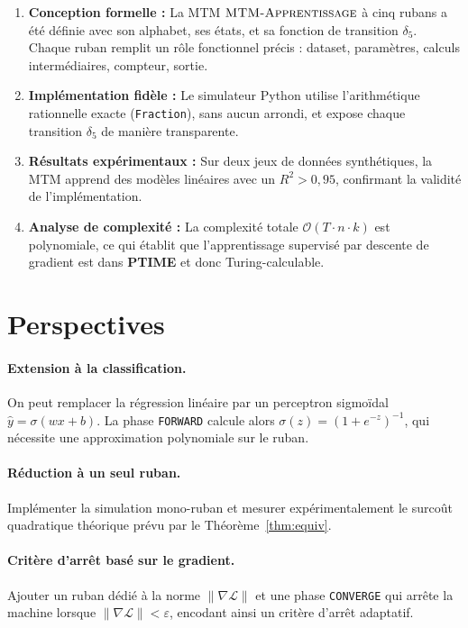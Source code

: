 \documentclass[12pt, a4paper, oneside]{report}
\newcommand{\mtmlong}{\textsc{MTM-Apprentissage}}
\newcommand{\state}[1]{\texttt{#1}}
\begin{document}
\begin{enumerate}[leftmargin=*, label=\textbf{C\arabic*.}]
  \item \textbf{Conception formelle :} La MTM $\mtmlong$ à cinq rubans a été définie avec son alphabet, ses états, et sa fonction de transition $\delta_5$. Chaque ruban remplit un rôle fonctionnel précis : dataset, paramètres, calculs intermédiaires, compteur, sortie.

  \item \textbf{Implémentation fidèle :} Le simulateur Python utilise l'arithmétique rationnelle exacte (\texttt{Fraction}), sans aucun arrondi, et expose chaque transition $\delta_5$ de manière transparente.

  \item \textbf{Résultats expérimentaux :} Sur deux jeux de données synthétiques, la MTM apprend des modèles linéaires avec un $R^2 > 0{,}95$, confirmant la validité de l'implémentation.

  \item \textbf{Analyse de complexité :} La complexité totale $\mathcal{O}(T \cdot n \cdot k)$ est polynomiale, ce qui établit que l'apprentissage supervisé par descente de gradient est dans \textbf{PTIME} et donc Turing-calculable.
\end{enumerate}

\section{Perspectives}

\paragraph{Extension à la classification.} On peut remplacer la régression linéaire par un perceptron sigmoïdal $\hat{y} = \sigma(wx+b)$. La phase \state{FORWARD} calcule alors $\sigma(z) = (1 + e^{-z})^{-1}$, qui nécessite une approximation polynomiale sur le ruban.

\paragraph{Réduction à un seul ruban.} Implémenter la simulation mono-ruban et mesurer expérimentalement le surcoût quadratique théorique prévu par le Théorème~\ref{thm:equiv}.

\paragraph{Critère d'arrêt basé sur le gradient.} Ajouter un ruban dédié à la norme $\|\nabla \mathcal{L}\|$ et une phase \state{CONVERGE} qui arrête la machine lorsque $\|\nabla \mathcal{L}\| < \varepsilon$, encodant ainsi un critère d'arrêt adaptatif.
\end{document}
